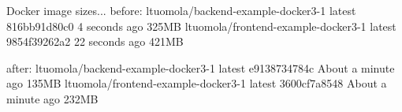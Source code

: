 Docker image sizes...
before:
ltuomola/backend-example-docker3-1         latest              816bb91d80c0        4 seconds ago       325MB
ltuomola/frontend-example-docker3-1        latest              9854f39262a2        22 seconds ago      421MB

after:
ltuomola/backend-example-docker3-1         latest              e9138734784c        About a minute ago   135MB
ltuomola/frontend-example-docker3-1        latest              3600cf7a8548        About a minute ago   232MB


